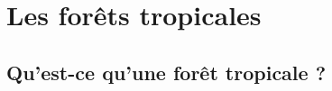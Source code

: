 \documentclass[10pt,table,dvipsnames,compress]{beamer}
\newif\ifplacelogo %
\begin{document}
\section{Les forêts tropicales}
\label{sec:orgb955b1e}

\subsection{Qu'est-ce qu'une forêt tropicale ?}
\label{sec:orgcadce0c}
\end{document}
